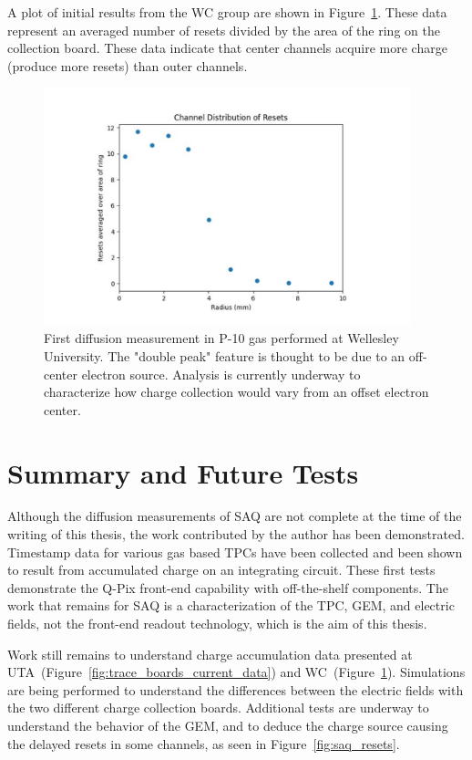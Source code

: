 A plot of initial results from the WC group are shown in Figure~\ref{fig:saq_first_diffusion_measurement}.
These data represent an averaged number of resets divided by the area of the ring on the collection board.
These data indicate that center channels acquire more charge (produce more resets) than outer channels.

\begin{figure}[t!]
\centering
\includegraphics[width=0.95\textwidth]{images/SAQ_first_diffusion_measurement.pdf}
\caption{First diffusion measurement in P-10 gas performed at Wellesley University.
The "double peak" feature is thought to be due to an off-center electron source.
Analysis is currently underway to characterize how charge collection would vary from an offset electron center.
}
\label{fig:saq_first_diffusion_measurement}
\end{figure}

\section{Summary and Future Tests}
Although the diffusion measurements of SAQ are not complete at the time of the writing of this thesis, the work contributed by the author has been demonstrated.
Timestamp data for various gas based TPCs have been collected and been shown to result from accumulated charge on an integrating circuit.
These first tests demonstrate the Q-Pix front-end capability with off-the-shelf components.
The work that remains for SAQ is a characterization of the TPC, GEM, and electric fields, not the front-end readout technology, which is the aim of this thesis.

Work still remains to understand charge accumulation data presented at UTA~(Figure~\ref{fig:trace_boards_current_data}) and WC~(Figure~\ref{fig:saq_first_diffusion_measurement}).
Simulations are being performed to understand the differences between the electric fields with the two different charge collection boards.
Additional tests are underway to understand the behavior of the GEM, and to deduce the charge source causing the delayed resets in some channels, as seen in Figure~\ref{fig:saq_resets}.
